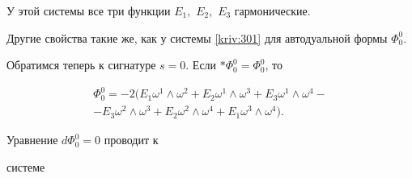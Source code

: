 У этой системы все три функции $E_{1},$ $E_{2},$ $E_{3}$ гармонические. 

Другие свойства такие же, как у системы \eqref{kriv:301} для автодуальной формы $\Phi _{0}^{0}$.



Обратимся теперь к сигнатуре $s=0.$ Если $\ast \Phi _{0}^{0}=\Phi _{0}^{0}$, то









\begin{multline*}

\Phi _{0}^{0}=-2\bigl( 


E_{1}\omega ^{1}\wedge \omega ^{2}+E_{2}\omega ^{1}\wedge \omega

^{3}+E_{3}\omega ^{1}\wedge \omega ^{4}- \\ 

-E_{3}\omega ^{2}\wedge \omega ^{3}+E_{2}\omega ^{2}\wedge \omega

^{4}+E_{1}\omega ^{3}\wedge \omega ^{4}


\bigr) .

\end{multline*}

Уравнение $d\Phi

_{0}^{0}=0$ проводит к 

системе

